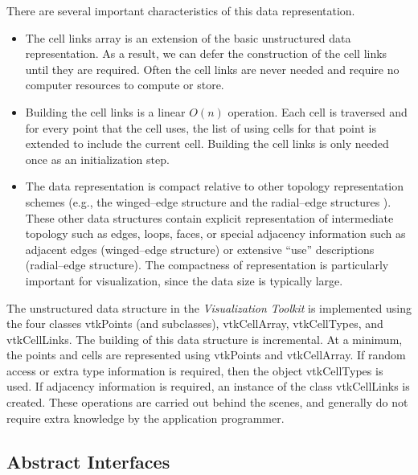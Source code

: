 There are several important characteristics of this data representation.

\begin{itemize}

\item The cell links array is an extension of the basic unstructured data representation. As a result, we can defer the construction of the cell links until they are required. Often the cell links are never needed and require no computer resources to compute or store.

\item Building the cell links is a linear $O(n)$ operation. Each cell is traversed and for every point that the cell uses, the list of using cells for that point is extended to include the current cell. Building the cell links is only needed once as an initialization step.

\item The data representation is compact relative to other topology representation schemes (e.g., the winged--edge structure and the radial--edge structures \cite{Baumgart74} \cite{Weiler88}). These other data structures contain explicit representation of intermediate topology such as edges, loops, faces, or special adjacency information such as adjacent edges (winged--edge structure) or extensive ``use'' descriptions (radial--edge structure). The compactness of representation is particularly important for visualization, since the data size is typically large.

\end{itemize}

The unstructured data structure in the \emph{Visualization Toolkit} is implemented using the four classes vtkPoints (and subclasses), vtkCellArray, vtkCellTypes, and vtkCellLinks. The building of this data structure is incremental. At a minimum, the points and cells are represented using vtkPoints and vtkCellArray. If random access or extra type information is required, then the object vtkCellTypes is used. If adjacency information is required, an instance of the class vtkCellLinks is created. These operations are carried out behind the scenes, and generally do not require extra knowledge by the application programmer.

\clearpage

\subsection{Abstract Interfaces}


